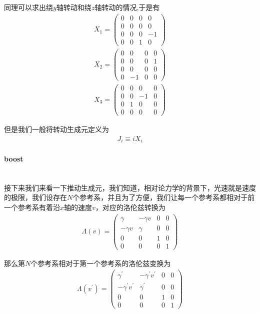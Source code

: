 \documentclass{article}
\begin{document}
同理可以求出绕$y$轴转动和绕$z$轴转动的情况,于是有
\begin{align*}
    X_1=
    \begin{pmatrix}
        0&0&0&0\\
        0&0&0&0\\
        0&0&0&-1\\
        0&0&1&0    
    \end{pmatrix}
\end{align*}
\begin{align*}
    X_2=
    \begin{pmatrix}
        0&0&0&0\\
        0&0&0&1\\
        0&0&0&0\\
        0&-1&0&0  
    \end{pmatrix}
\end{align*}
\begin{align*}
    X_3=
    \begin{pmatrix}
        0&0&0&0\\
        0&0&-1&0\\
        0&1&0&0\\
        0&0&0&0   
    \end{pmatrix}
\end{align*}

但是我们一般将转动生成元定义为
\begin{align*}
    J_i\equiv iX_i
\end{align*}

\paragraph{boost}\ \\
接下来我们来看一下推动生成元，我们知道，相对论力学的背景下，光速就是速度的极限，我们设存在$N$个参考系，并且为了方便，我们让每一个参考系都相对于前一个参考系有着沿$x$轴的速度$v$，对应的洛伦兹转换为
\begin{align*}
    \varLambda(v)=
    \begin{pmatrix}
        \gamma&-\gamma v&0&0\\
        -\gamma v&\gamma&0&0\\
        0&0&1&0\\
        0&0&0&1   
    \end{pmatrix}
\end{align*}

那么第$N$个参考系相对于第一个参考系的洛伦兹变换为
\begin{align*}
    \varLambda(v^\prime)=
    \begin{pmatrix}
        \gamma^\prime&-\gamma^\prime v^\prime&0&0\\
        -\gamma^\prime v^\prime&\gamma^\prime&0&0\\
        0&0&1&0\\
        0&0&0&1   
    \end{pmatrix}
\end{align*}
\end{document}
